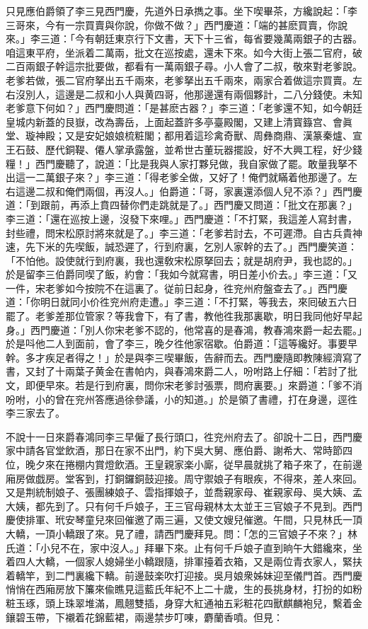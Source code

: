 只見應伯爵領了李三見西門慶，先道外日承擕之事。坐下喫畢茶，方纔說起：「李三哥來，今有一宗買賣與你說，你做不做？」西門慶道：「端的甚麽買賣，你說來。」李三道：「今有朝廷東京行下文書，天下十三省，每省要幾萬兩銀子的古器。咱這東平府，坐派着二萬兩，批文在巡按處，還未下來。如今大街上張二官府，破二百兩銀子幹這宗批要做，都看有一萬兩銀子尋。小人會了二叔，敬來對老爹說。老爹若做，張二官府拏出五千兩來，老爹拏出五千兩來，兩家合着做這宗買賣。左右沒別人，這邊是二叔和小人與黄四哥，他那邊還有兩個夥計，二八分錢使。未知老爹意下何如？」西門慶問道：「是甚麽古器？」李三道：「老爹還不知，如今朝廷皇城内新蓋的艮嶽，改為壽岳，上面起蓋許多亭臺殿閣，又建上清寳籙宫、會眞堂、璇神殿；又是安妃娘娘梳粧閣；都用着這珍禽奇獸、周彝商鼎、漢篆秦爐、宣王石鼓、歷代銅鞮、僊人掌承露盤，並希世古董玩器擺設，好不大興工程，好少錢糧！」西門慶聽了，說道：「比是我與人家打夥兒做，我自家做了罷。敢量我拏不出這一二萬銀子來？」李三道：「得老爹全做，又好了！俺們就瞞着他那邊了。左右這邊二叔和俺們兩個，再沒人。」伯爵道：「哥，家裏還添個人兒不添？」西門慶道：「到跟前，再添上賁四替你們走跳就是了。」西門慶又問道：「批文在那裏？」李三道：「還在巡按上邊，沒發下來哩。」西門慶道：「不打緊，我這差人寫封書，封些禮，問宋松原討將來就是了。」李三道：「老爹若討去，不可遲滯。自古兵貴神速，先下米的先喫飯，誠恐遲了，行到府裏，乞別人家幹的去了。」西門慶笑道：「不怕他。設使就行到府裏，我也還敎宋松原拏回去；就是胡府尹，我也認的。」於是留李三伯爵同喫了飯，約會：「我如今就寫書，明日差小价去。」李三道：「又一件，宋老爹如今按院不在這裏了。従前日起身，徃兖州府盤查去了。」西門慶道：「你明日就同小价徃兖州府走遭。」李三道：「不打緊，等我去，來囘破五六日罷了。老爹差那位管家？等我會下，有了書，教他徃我那裏歇，明日我同他好早起身。」西門慶道：「別人你宋老爹不認的，他常喜的是春鴻，教春鴻來爵一起去罷。」於是呌他二人到面前，會了李三，晚夕徃他家宿歇。伯爵道：「這等纔好。事要早幹。多才疾足者得之！」於是與李三喫畢飯，告辭而去。西門慶隨即教陳經濟寫了書，又封了十兩葉子黄金在書帕内，與春鴻來爵二人，吩咐路上仔細：「若討了批文，即便早來。若是行到府裏，問你宋老爹討張票，問府裏要。」來爵道：「爹不消吩咐，小的曾在兖州答應過徐參議，小的知道。」於是領了書禮，打在身邊，逕徃李三家去了。

不說十一日來爵春鴻同李三早僱了長行頭口，徃兖州府去了。卻說十二日，西門慶家中請各官堂飲酒，那日在家不出門，約下吳大舅、應伯爵、謝希大、常時節四位，晚夕來在捲棚内賞燈飲酒。王皇親家楽小廝，従早晨就挑了箱子來了，在前邊廂房做戯房。堂客到，打銅鑼銅鼓迎接。周守禦娘子有眼疾，不得來，差人來回。又是荆統制娘子、張團練娘子、雲指揮娘子，並喬親家母、崔親家母、吳大姨、孟大姨，都先到了。只有何千戶娘子，王三官母親林太太並王三官娘子不見到。西門慶使排軍、玳安琴童兒來回催邀了兩三遍，又使文嫂兒催邀。午間，只見林氏一頂大轎，一頂小轎跟了來。見了禮，請西門慶拜見。問：「怎的三官娘子不來？」林氏道：「小兒不在，家中沒人。」拜畢下來。止有何千戶娘子直到晌午大錯纔來，坐着四人大轎，一個家人媳婦坐小轎跟隨，排軍擡着衣箱，又是兩位青衣家人，緊扶着轎竿，到二門裏纔下轎。前邊鼓楽吹打迎接。吳月娘衆姊妹迎至儀門首。西門慶悄悄在西廂房放下簾來偸瞧見這藍氏年紀不上二十歲，生的長挑身材，打扮的如粉粧玉琢，頭上珠翠堆滿，鳳翹雙插，身穿大紅通袖五彩粧花四獸麒麟袍兒，繫着金鑲碧玉帶，下襯着花錦藍裙，兩邊禁步叮㖦，麝蘭香噴。但見：

